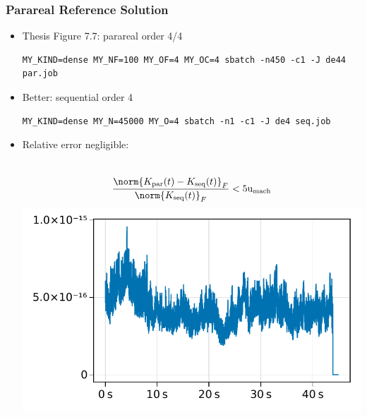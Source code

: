 \begin{frame}[fragile]
  \frametitle{Parareal Reference Solution}
  \begin{itemize}
    \item
      Thesis Figure 7.7: parareal order 4/4
      \hyperlink{fig:7.7}{}

      \begin{lstlisting}
MY_KIND=dense MY_NF=100 MY_OF=4 MY_OC=4 sbatch -n450 -c1 -J de44 par.job
      \end{lstlisting}
    \item
      Better: sequential order 4

      \begin{lstlisting}
MY_KIND=dense MY_N=45000 MY_O=4 sbatch -n1 -c1 -J de4 seq.job
      \end{lstlisting}
    \item
      Relative error negligible:
      \begin{minipage}{\linewidth}
      \begin{columns}[totalwidth=\linewidth]
        \begin{equation*}
          \frac{\norm{K_\text{par}(t) - K_\text{seq}(t)}_F}{\norm{K_\text{seq}(t)}_F}
          < 5\umach
        \end{equation*}
        \includegraphics[width=\textwidth]{figures/slides-seq-parareal-ref.pdf}
      \end{columns}
      \end{minipage}
  \end{itemize}
\end{frame}

